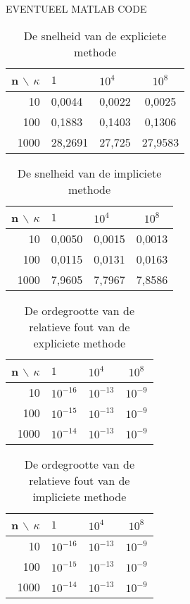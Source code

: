 EVENTUEEL MATLAB CODE

\begin{table}
\begin{center}
\begin{tabular}{r|llc}
n $\backslash$ $\kappa$ & $1$ & $10^4$ & $10^8$ \\\hline
10 & 0,0044 & 0,0022 & 0,0025 \\
100 & 0,1883 & 0,1403 & 0,1306 \\
1000 & 28,2691 & 27,725 & 27,9583
\end{tabular}
\end{center}
\caption{De snelheid van de expliciete methode}
\label{snelheid_exp}
\end{table}

\begin{table}
\begin{center}
\begin{tabular}{r|llc}
n $\backslash$ $\kappa$ & $1$ & $10^4$ & $10^8$ \\\hline
10 & 0,0050 & 0,0015 & 0,0013 \\
100 & 0,0115 & 0,0131 & 0,0163 \\
1000 & 7,9605 & 7,7967 & 7,8586
\end{tabular}
\end{center}
\caption{De snelheid van de impliciete methode}
\label{snelheid_imp}
\end{table}

\begin{table}
\begin{center}
\begin{tabular}{r|llc}
n $\backslash$ $\kappa$ & $1$ & $10^4$ & $10^8$ \\\hline
10 & $10^{-16}$ & $10^{-13}$ & $10^{-9}$ \\
100 & $10^{-15}$ & $10^{-13}$ & $10^{-9}$ \\
1000 & $10^{-14}$ & $10^{-13}$ & $10^{-9}$
\end{tabular}
\end{center}
\caption{De ordegrootte van de relatieve fout van de expliciete methode}
\label{dw_exp}
\end{table}

\begin{table}
\begin{center}
\begin{tabular}{r|llc}
n $\backslash$ $\kappa$ & $1$ & $10^4$ & $10^8$ \\\hline
10 & $10^{-16}$ & $10^{-13}$ & $10^{-9}$ \\
100 & $10^{-15}$ & $10^{-13}$ & $10^{-9}$ \\
1000 & $10^{-14}$ & $10^{-13}$ & $10^{-9}$
\end{tabular}
\end{center}
\caption{De ordegrootte van de relatieve fout van de impliciete methode}
\label{dx_imp}
\end{table}

